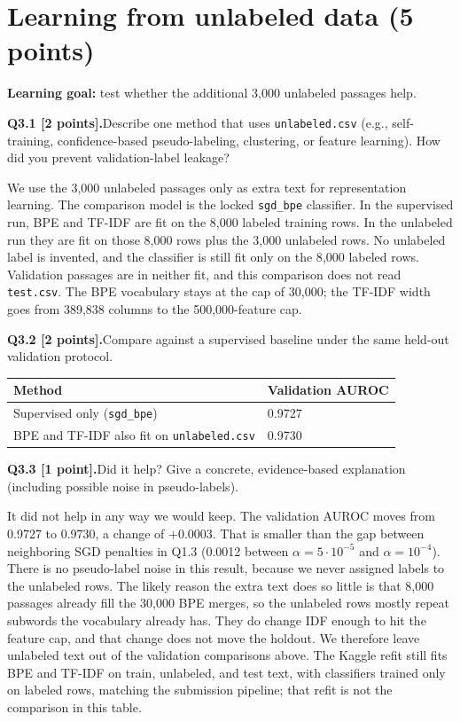 \documentclass[11pt,letterpaper]{article}
\newcommand{\question}[2]{\needspace{4\baselineskip}\par\addvspace{0.45em}\noindent\textbf{#1}\quad #2\par\nobreak\vspace{0.1em}}
\begin{document}
\section{Learning from unlabeled data (5 points)}
\textbf{Learning goal:} test whether the additional 3,000 unlabeled passages help.
\question{Q3.1 [2 points].}{Describe one method that uses \texttt{unlabeled.csv} (e.g., self-training, confidence-based pseudo-labeling, clustering, or feature learning). How did you prevent validation-label leakage?}

We use the 3{,}000 unlabeled passages only as extra text for representation learning. The comparison model is the locked \texttt{sgd\_bpe} classifier. In the supervised run, BPE and TF-IDF are fit on the 8{,}000 labeled training rows. In the unlabeled run they are fit on those 8{,}000 rows plus the 3{,}000 unlabeled rows. No unlabeled label is invented, and the classifier is still fit only on the 8{,}000 labeled rows. Validation passages are in neither fit, and this comparison does not read \texttt{test.csv}. The BPE vocabulary stays at the cap of 30{,}000; the TF-IDF width goes from 389{,}838 columns to the 500{,}000-feature cap.

\question{Q3.2 [2 points].}{Compare against a supervised baseline under the same held-out validation protocol.}
\begin{tabularx}{\linewidth}{@{}Yp{1.5in}@{}}\toprule Method & Validation AUROC \\ \midrule
Supervised only (\texttt{sgd\_bpe}) & 0.9727 \\
BPE and TF-IDF also fit on \texttt{unlabeled.csv} & 0.9730 \\
\bottomrule\end{tabularx}

\question{Q3.3 [1 point].}{Did it help? Give a concrete, evidence-based explanation (including possible noise in pseudo-labels).}

It did not help in any way we would keep. The validation AUROC moves from 0.9727 to 0.9730, a change of $+0.0003$. That is smaller than the gap between neighboring SGD penalties in Q1.3 (0.0012 between $\alpha=5\cdot10^{-5}$ and $\alpha=10^{-4}$). There is no pseudo-label noise in this result, because we never assigned labels to the unlabeled rows. The likely reason the extra text does so little is that 8{,}000 passages already fill the 30{,}000 BPE merges, so the unlabeled rows mostly repeat subwords the vocabulary already has. They do change IDF enough to hit the feature cap, and that change does not move the holdout. We therefore leave unlabeled text out of the validation comparisons above. The Kaggle refit still fits BPE and TF-IDF on train, unlabeled, and test text, with classifiers trained only on labeled rows, matching the submission pipeline; that refit is not the comparison in this table.
\end{document}
